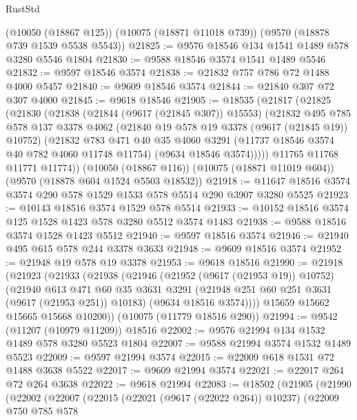 \begin{lexlean}{RustStd}
\begin{coremodule}
{\begin{coremodule}
{{{{{{{{{{{{{{{{{{{{{{{{{{{{{{{{{    (@10050 (@18867 @125))
    (@10075 (@18871 @11018 @739))
    (@9570 (@18878 @739 @1539 @5538 @5543))
@21825 := @9576 @18546 @134 @1541 @1489 @578 @3280 @5546 @1804
@21830 := @9588 @18546 @3574 @1541 @1489 @5546
@21832 := @9597 @18546 @3574
@21838 := @21832 @757 @786 @72 @1488 @4000 @5457
@21840 := @9609 @18546 @3574
@21844 := @21840 @307 @72 @307 @4000
@21845 := @9618 @18546
@21905 := @18535
    (@21817
      (@21825
        (@21830
          (@21838
            (@21844 (@9617 (@21845 @307)) @15553)
            (@21832
              @495
              @785
              @578
              @137
              @3378
              @4062
              (@21840 @19 @578 @19 @3378 (@9617 (@21845 @19)) @10752)
              (@21832
                @783
                @471
                @40
                @35
                @4060
                @3291
                (@11737 @18546 @3574 @40 @782 @4060 @11748 @11754)
                (@9634 @18546 @3574)))))
        @11765
        @11768
        @11771
        @11774))
    (@10050 (@18867 @116))
    (@10075 (@18871 @11019 @604))
    (@9570 (@18878 @604 @1524 @5503 @18532))
@21918 := @11647 @18516 @3574 @3574 @290 @578 @1529 @1533 @578 @5514 @290 @3907 @3280 @5525
@21923 := @10143 @18516 @3574 @1529 @578 @5514
@21933 := @10152 @18516 @3574 @125 @1528 @1423 @578 @3280 @5512 @3574 @1483
@21938 := @9588 @18516 @3574 @1528 @1423 @5512
@21940 := @9597 @18516 @3574
@21946 := @21940 @495 @615 @578 @244 @3378 @3633
@21948 := @9609 @18516 @3574
@21952 := @21948 @19 @578 @19 @3378
@21953 := @9618 @18516
@21990 := @21918
    (@21923
      (@21933
        (@21938
          (@21946
            (@21952 (@9617 (@21953 @19)) @10752)
            (@21940
              @613
              @471
              @60
              @35
              @3631
              @3291
              (@21948 @251 @60 @251 @3631 (@9617 (@21953 @251)) @10183)
              (@9634 @18516 @3574))))
        @15659
        @15662
        @15665
        @15668
        @10200))
    (@10075 (@11779 @18516 @290))
@21994 := @9542 (@11207 (@10979 @11209)) @18516
@22002 := @9576 @21994 @134 @1532 @1489 @578 @3280 @5523 @1804
@22007 := @9588 @21994 @3574 @1532 @1489 @5523
@22009 := @9597 @21994 @3574
@22015 := @22009 @618 @1531 @72 @1488 @3638 @5522
@22017 := @9609 @21994 @3574
@22021 := @22017 @264 @72 @264 @3638
@22022 := @9618 @21994
@22083 := @18502
    (@21905
      (@21990
        (@22002
          (@22007
            (@22015
              (@22021 (@9617 (@22022 @264)) @10237)
              (@22009
                @750
                @785
                @578
}}}}}}}}}}}}}}}}}}}}}}}}}}}}}}}}}
\end{coremodule}}
\end{coremodule}
\end{lexlean}
